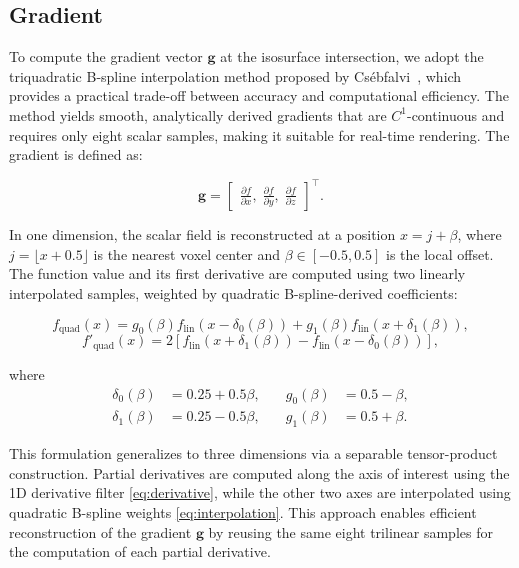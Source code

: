 \documentclass[conference]{IEEEtran}
\begin{document}
\subsection{Gradient}

To compute the gradient vector $\mathbf{g}$ at the isosurface intersection, we adopt the triquadratic B-spline interpolation method proposed by Csébfalvi~\cite{csebfalvi2019beyond}, which provides a practical trade-off between accuracy and computational efficiency. The method yields smooth, analytically derived gradients that are $C^1$-continuous and requires only eight scalar samples, making it suitable for real-time rendering. The gradient is defined as:

\begin{equation}
\mathbf{g} =
\begin{bmatrix}
\frac{\partial f}{\partial x}, \;
\frac{\partial f}{\partial y}, \;
\frac{\partial f}{\partial z}
\end{bmatrix}^\top.
\end{equation}

In one dimension, the scalar field is reconstructed at a position $x = j + \beta$, where $j = \lfloor x + 0.5 \rfloor$ is the nearest voxel center and $\beta \in [-0.5, 0.5]$ is the local offset. The function value and its first derivative are computed using two linearly interpolated samples, weighted by quadratic B-spline-derived coefficients:

\begin{equation}
f_{\text{quad}}(x) = g_0(\beta) f_{\text{lin}}(x - \delta_0(\beta)) + g_1(\beta) f_{\text{lin}}(x + \delta_1(\beta)),
\label{eq:interpolation}
\end{equation}
\begin{equation}
f'_{\text{quad}}(x) = 2 \left[ f_{\text{lin}}(x + \delta_1(\beta)) - f_{\text{lin}}(x - \delta_0(\beta)) \right],
\label{eq:derivative}
\end{equation}

where
\begin{align}
\delta_0(\beta) &= 0.25 + 0.5\beta, &\quad g_0(\beta) &= 0.5 - \beta, \\
\delta_1(\beta) &= 0.25 - 0.5\beta, &\quad g_1(\beta) &= 0.5 + \beta.
\end{align}

This formulation generalizes to three dimensions via a separable tensor-product construction. Partial derivatives are computed along the axis of interest using the 1D derivative filter \eqref{eq:derivative}, while the other two axes are interpolated using quadratic B-spline weights \eqref{eq:interpolation}. This approach enables efficient reconstruction of the gradient $\mathbf{g}$ by reusing the same eight trilinear samples for the computation of each partial derivative.
\end{document}

